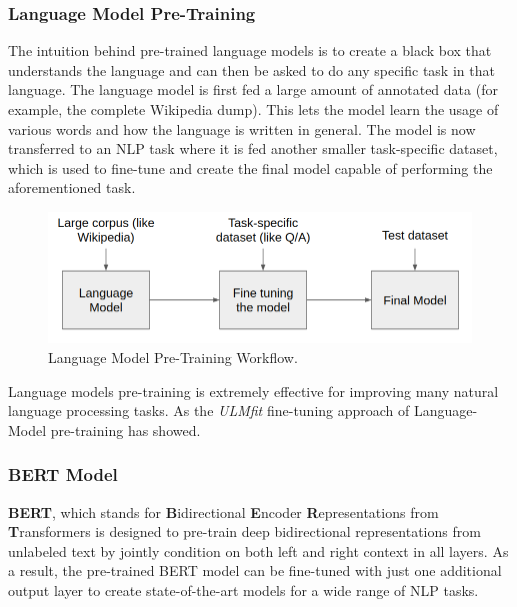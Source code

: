 \documentclass[a4paper, 12pt]{article}
\begin{document}
\begin{sloppypar}
\subsubsection{Language Model Pre-Training}

The intuition behind pre-trained language models is to create a black box that understands the language and can then be asked to do any specific task in that language. The language model is first fed a large amount of annotated data (for example, the complete Wikipedia dump). This lets the model learn the usage of various words and how the language is written in general. The model is now transferred to an NLP task where it is fed another smaller task-specific dataset, which is used to fine-tune and create the final model capable of performing the aforementioned task.\cite{ganesh_pre-trained_2019}

\begin{figure}[H]
\begin{center}
\includegraphics[scale=0.5]{lm.png}
\caption{ Language Model Pre-Training Workflow.\cite{ganesh_pre-trained_2019}} 
\end{center}
\end{figure}

Language models pre-training is extremely effective for improving many natural language processing tasks. As the \textit{ULMfit} fine-tuning approach of Language-Model pre-training has showed.\cite{howard_universal_2018}

\subsubsection{BERT Model}

\textbf{BERT}, which stands for \textbf{B}idirectional  \textbf{E}ncoder  \textbf{R}epresentations from  \textbf{T}ransformers is designed to pre-train deep bidirectional representations from unlabeled text by jointly condition on both left and right context in all layers. As a result, the pre-trained BERT model can be fine-tuned with just one additional output layer to create state-of-the-art models for a wide range of NLP tasks.\cite{devlin_bert_2019}


\end{sloppypar}
\end{document}
